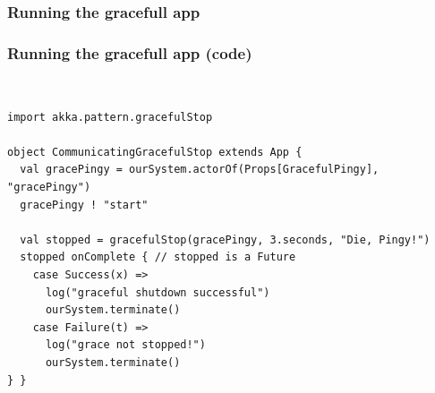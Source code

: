 \documentclass[aspectratio=169]{beamer}
\begin{document}
\begin{frame}[fragile]\frametitle{Running the gracefull app}
\centering
{}

\end{frame}

\begin{frame}[fragile]\frametitle{Running the gracefull app (code)}
~\\[-6mm]
\begin{lstlisting}[emph={Actor, Logging, Props, ourSystem,terminate,sleep,actorOf,receive,become,stop,onComplete,gracefulStop}]
import akka.pattern.gracefulStop

object CommunicatingGracefulStop extends App {
  val gracePingy = ourSystem.actorOf(Props[GracefulPingy], "gracePingy")
  gracePingy ! "start"

  val stopped = gracefulStop(gracePingy, 3.seconds, "Die, Pingy!")
  stopped onComplete { // stopped is a Future
    case Success(x) =>
      log("graceful shutdown successful")
      ourSystem.terminate()
    case Failure(t) =>
      log("grace not stopped!")
      ourSystem.terminate()
} }
\end{lstlisting}
\end{frame}
\end{document}
